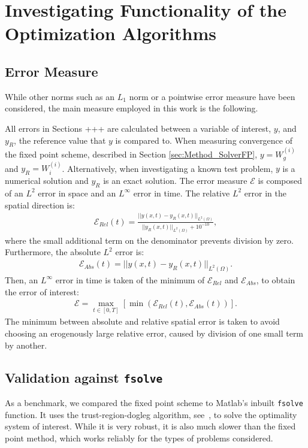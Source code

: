 \documentclass[11pt, a4paper]{article}
\theoremstyle{definition}
\begin{document}
\section{Investigating Functionality of the Optimization Algorithms}

\subsection{Error Measure}\label{sec:ErrorMeasure}
While other norms such as an $L_1$ norm or a pointwise error measure have been considered, the main measure employed in this work is the following.

All errors in Sections +++ are calculated between a variable of interest, $y$, and $y_R$, the reference value that $y$ is compared to. When measuring convergence of the fixed point scheme, described in Section \ref{sec:Method_SolverFP}, $y = W^{(i)}_g$ and $y_R = W^{(i)}_i$. Alternatively, when investigating a known test problem, $y$ is a numerical solution and $y_R$ is an exact solution. The error measure $\mathcal{E}$ is composed of an $L^2$ error in space and an $L^\infty$ error in time. The relative $L^2$ error in the spatial direction is:
\begin{align*}
\mathcal{E}_{Rel}(t) = \frac{|| y(x,t) - y_{R}(x,t)||_{L^2(\Omega)} }{||y_R(x,t) ||_{L^2(\Omega)}+ 10^{-10}},
\end{align*}
where the small additional term on the denominator prevents division by zero.
Furthermore, the absolute $L^2$ error is:
\begin{align*}
\mathcal{E}_{Abs}(t) = || y(x,t) - y_R(x,t)||_{L^2(\Omega)}.
\end{align*}
Then, an $L^\infty$ error in time is taken of the minimum of $\mathcal{E}_{Rel}$ and $\mathcal{E}_{Abs}$, to obtain the error of interest:
\begin{align*}
\mathcal{E} = \max_{t \in [0,T]}\left[\min\left(\mathcal{E}_{Rel}(t), \mathcal{E}_{Abs}(t)\right)\right].
\end{align*}
The minimum between absolute and relative spatial error is taken to avoid choosing an erogenously large relative error, caused by division of one small term by another.




\subsection{Validation against \texttt{fsolve}}
As a benchmark, we compared the fixed point scheme to Matlab's inbuilt \texttt{fsolve} function. It uses the trust-region-dogleg algorithm, see~\cite{Powell1}, to solve the optimality system of interest. While it is very robust, it is also much slower than the fixed point method, which works reliably for the types of problems considered. 

\end{document}
